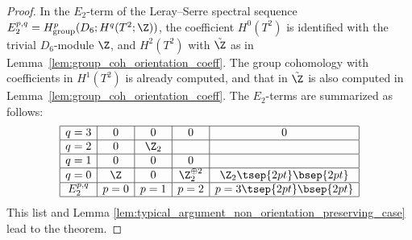 \begin{proof} In the $E_2$-term of the Leray--Serre spectral sequence $E_2^{p, q} = H^p_{\mathrm{group}}(D_6; H^q(T^2; \Z))$, the coef\/f\/icient $H^0(T^2)$ is identif\/ied with the trivial $D_6$-module $\Z$, and $H^2(T^2)$ with $\tilde{\Z}$ as in Lemma~\ref{lem:group_coh_orientation_coeff}. The group cohomology with coef\/f\/icients in $H^1(T^2)$ is already computed, and that in $\tilde{\Z}$ is also computed in Lemma~\ref{lem:group_coh_orientation_coeff}. The $E_2$-terms are summarized as follows:
$$
\begin{array}{|c|c|c|c|c|}
\hline
q = 3 & 0 & 0 & 0 & 0 \\
\hline
q = 2 & 0 & \Z_2 & & \\
\hline
q = 1 & 0 & 0 & 0 & \\
\hline
q = 0 & \Z & 0 & \Z_2^{\oplus 2} & \Z_2 \tsep{2pt}\bsep{2pt}\\
\hline
E_2^{p, q} & p = 0 & p = 1 & p = 2 & p = 3 \tsep{2pt}\bsep{2pt}\\
\hline
\end{array}
$$
This list and Lemma \ref{lem:typical_argument_non_orientation_preserving_case} lead to the theorem.
\end{proof}
